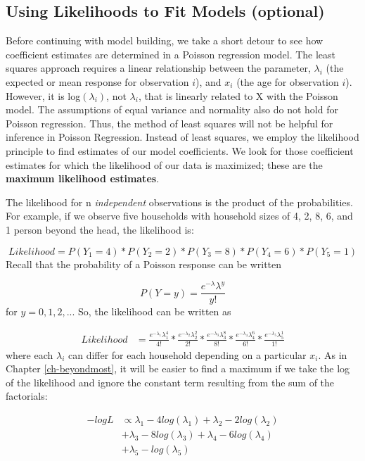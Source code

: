\documentclass[
]{krantz}
\begin{document}
\hypertarget{likelihood.sec}{%
\subsection{Using Likelihoods to Fit Models (optional)}\label{likelihood.sec}}

Before continuing with model building, we take a short detour to see how coefficient estimates are determined in a Poisson regression model. The least squares approach requires a linear relationship between the parameter, \(\lambda_i\) (the expected or mean response for observation \(i\)), and \(x_i\) (the age for observation \(i\)). However, it is log\((\lambda_i)\), not \(\lambda_i\), that is linearly related to X with the Poisson model. The assumptions of equal variance and normality also do not hold for Poisson regression. Thus, the method of least squares will not be helpful for inference in Poisson Regression. Instead of least squares, we employ the likelihood  principle to find estimates of our model coefficients. We look for those coefficient estimates for which the likelihood of our data is maximized; these are the \textbf{maximum likelihood estimates}. 

The likelihood for n \emph{independent}  observations is the product of the probabilities. For example, if we observe five households with household sizes of 4, 2, 8, 6, and 1 person beyond the head, the likelihood is:

\[ Likelihood = P(Y_1=4)*P(Y_2=2)*P(Y_3=8)*P(Y_4=6)*P(Y_5=1)\]
Recall that the probability of a Poisson response can be written

\[P(Y=y)=\frac{e^{-\lambda}\lambda^y}{y!}\]
for \(y = 0, 1, 2, ...\) So, the likelihood can be written as

\begin{align*}
 Likelihood&= \frac{ e^{-\lambda_1}\lambda_1^4 }{ 4! }*
 \frac{ e^{-\lambda_2}\lambda_2^2 }{ 2! } *\frac{e^{-\lambda_3}\lambda_3^8}{8!}*
 \frac{e^{-\lambda_4}\lambda_4^6}{6!}*\frac{e^{-\lambda_5}\lambda_5^1}{1!}
 \end{align*}
where each \(\lambda_i\) can differ for each household depending on a particular \(x_i\). As in Chapter \ref{ch-beyondmost}, it will be easier to find a maximum if we take the log of the likelihood and ignore the constant term resulting from the sum of the factorials:

\begin{align}
 -logL& \propto \lambda_{1}-4log(\lambda_{1})+\lambda_{2}-2log(\lambda_{2}) \nonumber \\
 & +\lambda_{3}-8log(\lambda_{3})+\lambda_{4}-6log(\lambda_{4}) \nonumber \\
 & +\lambda_{5}-log(\lambda_{5})
 \label{eq:poisLoglik}
\end{align}
\end{document}
